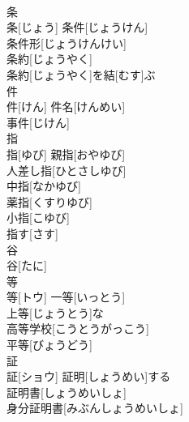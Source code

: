 \documentclass[8pt]{extreport}
\begin{document}
\begin{CJK}{UTF8}{min}
\\	条	
\\	条[じょう]	条件[じょうけん] 
\\	条件形[じょうけんけい] 
\\	条約[じょうやく] 
\\	条約[じょうやく]を結[むす]ぶ 
\\	件	
\\	件[けん]	件名[けんめい] 
\\	事件[じけん] 
\\	指	
\\	指[ゆび]	親指[おやゆび] 
\\	人差し指[ひとさしゆび] 
\\	中指[なかゆび] 
\\	薬指[くすりゆび] 
\\	小指[こゆび] 
\\	指す[さす] 
\\	谷	
\\	谷[たに]	
\\	等	
\\	等[トウ]	一等[いっとう] 
\\	上等[じょうとう]な 
\\	高等学校[こうとうがっこう] 
\\	平等[びょうどう] 
\\	証	
\\	証[ショウ]	証明[しょうめい]する 
\\	証明書[しょうめいしょ] 
\\	身分証明書[みぶんしょうめいしょ] 
\end{CJK}
\end{document}
